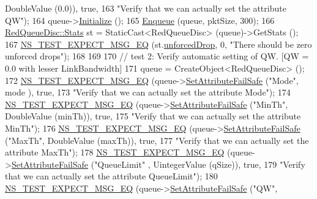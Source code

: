 \begin{DoxyCode}
      DoubleValue (0.0)), \textcolor{keyword}{true},
163                          \textcolor{stringliteral}{"Verify that we can actually set the attribute QW"});
164   queue->\hyperlink{classns3_1_1Object_af4411cb29971772fcd09203474a95078}{Initialize} ();
165   \hyperlink{classAredQueueDiscTestCase_a5528c44233e1056913e76d5be988f049}{Enqueue} (queue, pktSize, 300);
166   \hyperlink{structns3_1_1RedQueueDisc_1_1Stats}{RedQueueDisc::Stats} st = StaticCast<RedQueueDisc> (queue)->GetStats ();
167   \hyperlink{group__testing_ga7304ba46a28d8cf08dfdfd6499cf7068}{NS\_TEST\_EXPECT\_MSG\_EQ} (st.\hyperlink{structns3_1_1RedQueueDisc_1_1Stats_a242027f6eb7d30e2cd636c52080e2c73}{unforcedDrop}, 0, \textcolor{stringliteral}{"There should be zero
       unforced drops"});
168 
169 
170   \textcolor{comment}{// test 2: Verify automatic setting of QW. [QW = 0.0 with lesser LinkBandwidth]}
171   queue = CreateObject<RedQueueDisc> ();
172   \hyperlink{group__testing_ga7304ba46a28d8cf08dfdfd6499cf7068}{NS\_TEST\_EXPECT\_MSG\_EQ} (queue->\hyperlink{classns3_1_1ObjectBase_aa7d333004e970f925a4ed5df275541b5}{SetAttributeFailSafe} (\textcolor{stringliteral}{"Mode"}, mode
      ), \textcolor{keyword}{true},
173                          \textcolor{stringliteral}{"Verify that we can actually set the attribute Mode"});
174   \hyperlink{group__testing_ga7304ba46a28d8cf08dfdfd6499cf7068}{NS\_TEST\_EXPECT\_MSG\_EQ} (queue->\hyperlink{classns3_1_1ObjectBase_aa7d333004e970f925a4ed5df275541b5}{SetAttributeFailSafe} (\textcolor{stringliteral}{"MinTh"}, 
      DoubleValue (minTh)), \textcolor{keyword}{true},
175                          \textcolor{stringliteral}{"Verify that we can actually set the attribute MinTh"});
176   \hyperlink{group__testing_ga7304ba46a28d8cf08dfdfd6499cf7068}{NS\_TEST\_EXPECT\_MSG\_EQ} (queue->\hyperlink{classns3_1_1ObjectBase_aa7d333004e970f925a4ed5df275541b5}{SetAttributeFailSafe} (\textcolor{stringliteral}{"MaxTh"}, 
      DoubleValue (maxTh)), \textcolor{keyword}{true},
177                          \textcolor{stringliteral}{"Verify that we can actually set the attribute MaxTh"});
178   \hyperlink{group__testing_ga7304ba46a28d8cf08dfdfd6499cf7068}{NS\_TEST\_EXPECT\_MSG\_EQ} (queue->\hyperlink{classns3_1_1ObjectBase_aa7d333004e970f925a4ed5df275541b5}{SetAttributeFailSafe} (\textcolor{stringliteral}{"QueueLimit"}
      , UintegerValue (qSize)), \textcolor{keyword}{true},
179                          \textcolor{stringliteral}{"Verify that we can actually set the attribute QueueLimit"});
180   \hyperlink{group__testing_ga7304ba46a28d8cf08dfdfd6499cf7068}{NS\_TEST\_EXPECT\_MSG\_EQ} (queue->\hyperlink{classns3_1_1ObjectBase_aa7d333004e970f925a4ed5df275541b5}{SetAttributeFailSafe} (\textcolor{stringliteral}{"QW"}, 

\end{DoxyCode}
